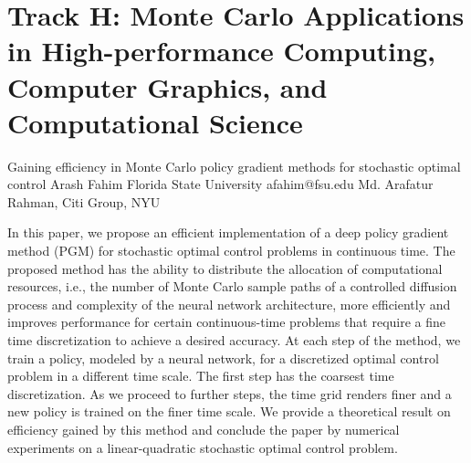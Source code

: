 \section{Track H: Monte Carlo Applications in High-performance Computing, Computer Graphics, and Computational Science}\newpage

\begin{talk}
  {Gaining efficiency in Monte Carlo policy gradient methods for stochastic optimal control}%
  {Arash Fahim}%
  {Florida State University}%
  {afahim@fsu.edu}%
  {Md. Arafatur Rahman, Citi Group, NYU}%
  
    
   
In this paper, we propose an efficient implementation of a deep policy gradient method (PGM) for stochastic optimal control problems in continuous time. The proposed method has the ability to distribute the allocation of computational resources, i.e., the number of Monte Carlo  sample paths of a controlled diffusion process and complexity of the neural network architecture, more efficiently and improves performance for certain continuous-time problems that require a fine time discretization to achieve a desired accuracy. At each step of the method, we train a policy, modeled by a neural network, for a discretized optimal control problem in a different time scale. The first step has the coarsest time discretization. As we proceed to further steps, the time grid renders finer and a new policy is trained on the finer time scale. We provide a theoretical result on efficiency gained by this method and conclude the paper by numerical experiments on a linear-quadratic stochastic optimal control problem.

\medskip


\end{talk}

